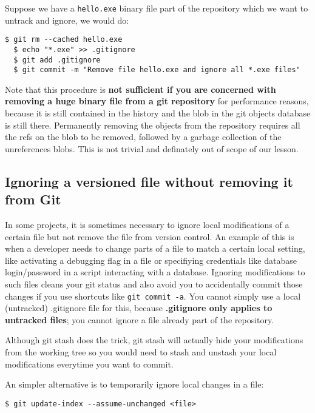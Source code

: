 \documentclass{../../common/tufte-latex/tufte-handout}
\begin{document}
Suppose we have a \texttt{hello.exe} binary file part of the repository which we want to untrack and ignore, we would do:
\begin{lstlisting}[style=BashInputStyle]
  $ git rm --cached hello.exe
  $ echo "*.exe" >> .gitignore
  $ git add .gitignore
  $ git commit -m "Remove file hello.exe and ignore all *.exe files"
\end{lstlisting}

Note that this procedure is \textbf{not sufficient if you are concerned with removing a huge binary file from a git repository} for performance reasons, because it is still contained in the history and the blob in the git objects database is still there.
Permanently removing the objects from the repository requires all the refs on the blob to be removed, followed by a garbage collection of the unreferences blobs.
This is not trivial and definately out of scope of our lesson.

\subsection{Ignoring a versioned file without removing it from Git}
In some projects, it is sometimes necessary to ignore local modifications of a certain file but not remove the file from version control.
An example of this is when a developer needs to change parts of a file to match a certain local setting, like activating a debugging flag in a file or specifiying credentials like database login/password in a script interacting with a database.
Ignoring modifications to such files cleans your git status and also avoid you to accidentally commit those changes if you use shortcuts like \texttt{git commit -a}.
You cannot simply use a local (untracked) .gitignore file for this, because \textbf{.gitignore only applies to untracked files}; you cannot ignore a file already part of the repository.

Although git stash does the trick, git stash will actually hide your modifications from the working tree so you would need to stash and unstash your local modifications everytime you want to commit.

An simpler alternative is to temporarily ignore local changes in a file:
\begin{lstlisting}[style=BashInputStyle]
  $ git update-index --assume-unchanged <file>
\end{lstlisting}
\end{document}
